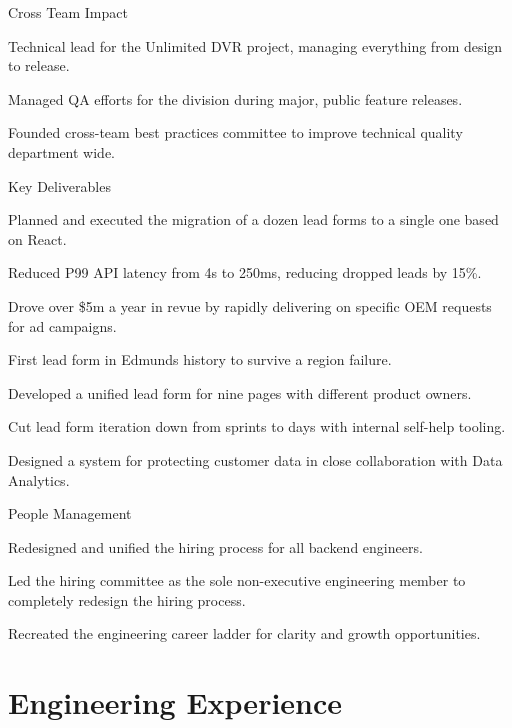 \documentclass[]{deedy-resume-openfont}
\begin{document}
Cross Team Impact
\begin{tightemize}
\item Technical lead for the Unlimited DVR project, managing everything from design to release.
\item Managed QA efforts for the division during major, public feature releases.
\item Founded cross-team best practices committee to improve technical quality department wide.
\end{tightemize}
\sectionsep

\vspace{\topsep}
Key Deliverables
\begin{tightemize}
\item Planned and executed the migration of a dozen lead forms to a single one based on React.
\item Reduced P99 API latency from 4s to 250ms, reducing dropped leads by 15\%.
\item Drove over \$5m a year in revue by rapidly delivering on specific OEM requests for ad campaigns.
\item First lead form in Edmunds history to survive a region failure.
\item Developed a unified lead form for nine pages with different product owners.
\item Cut lead form iteration down from sprints to days with internal self-help tooling.
\item Designed a system for protecting customer data in close collaboration with Data Analytics.
\end{tightemize}
\sectionsep
People Management
\begin{tightemize}
  \item Redesigned and unified the hiring process for all backend engineers.
  \item Led the hiring committee as the sole non-executive engineering member to completely redesign the hiring process.
  \item Recreated the engineering career ladder for clarity and growth opportunities.
\end{tightemize}

\pagebreak

\section{Engineering Experience}
\end{document}

